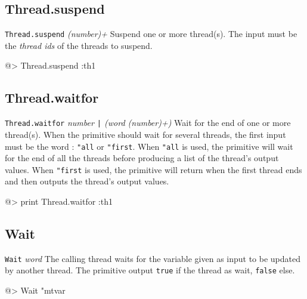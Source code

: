 \subsection*{Thread.suspend} 

{\tt Thread.suspend} {\it (number)+}
\newline\newline
Suspend one or more thread(s). The input must be the {\em thread ids} of the threads to suspend.
\begin{verbatimtab}
@> Thread.suspend :th1
\end{verbatimtab}

\subsection*{Thread.waitfor} 

{\tt Thread.waitfor} {\it number \verb+|+ (word (number)+)}
\newline\newline
Wait for the end of one or more thread(s). When the primitive should wait for several threads, the first input must be the word : {\tt "all} or {\tt "first}. When {\tt "all} is used, the primitive will wait for the end of all the threads before producing a list of the thread's output values. When {\tt "first} is used, the primitive will return when the first thread ends and then outputs the thread's output values.
\begin{verbatimtab}
@> print Thread.waitfor :th1
\end{verbatimtab}

\subsection*{Wait} 

{\tt Wait} {\it word}
\newline\newline
The calling thread waits for the variable given as input to be updated by another thread. The primitive output {\tt true} if the thread as wait, {\tt false} else.
\begin{verbatimtab}
@> Wait "mtvar
\end{verbatimtab}
